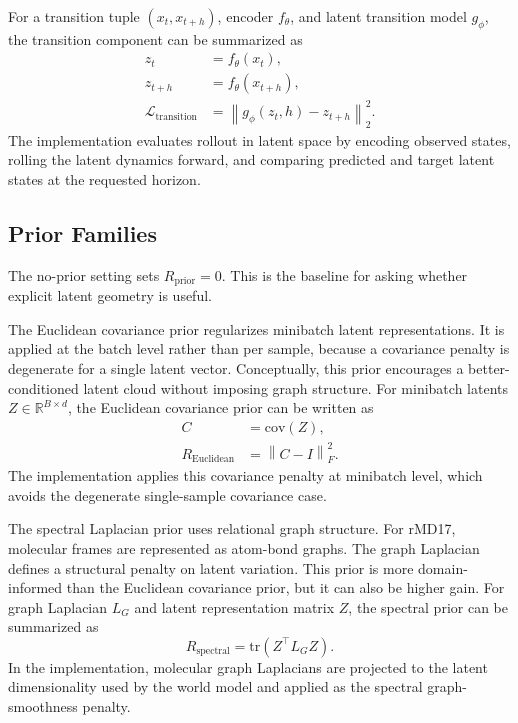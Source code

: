 \documentclass[pdflatex,sn-mathphys-num]{sn-jnl}
\begin{document}
For a transition tuple $(x_t, x_{t+h})$, encoder $f_\theta$, and latent transition model $g_\phi$, the transition component can be summarized as
\begin{align}
    z_t &= f_\theta(x_t),\\
    z_{t+h} &= f_\theta(x_{t+h}),\\
    \mathcal{L}_{\mathrm{transition}} &= \left\lVert g_\phi(z_t, h) - z_{t+h} \right\rVert_2^2.
\end{align}
The implementation evaluates rollout in latent space by encoding observed states, rolling the latent dynamics forward, and comparing predicted and target latent states at the requested horizon.

\subsection{Prior Families}

The no-prior setting sets $R_{\mathrm{prior}} = 0$. This is the baseline for asking whether explicit latent geometry is useful.

The Euclidean covariance prior regularizes minibatch latent representations. It is applied at the batch level rather than per sample, because a covariance penalty is degenerate for a single latent vector. Conceptually, this prior encourages a better-conditioned latent cloud without imposing graph structure. For minibatch latents $Z \in \mathbb{R}^{B \times d}$, the Euclidean covariance prior can be written as
\begin{align}
    C &= \mathrm{cov}(Z),\\
    R_{\mathrm{Euclidean}} &= \left\lVert C - I \right\rVert_F^2.
\end{align}
The implementation applies this covariance penalty at minibatch level, which avoids the degenerate single-sample covariance case.

The spectral Laplacian prior uses relational graph structure. For rMD17, molecular frames are represented as atom-bond graphs. The graph Laplacian defines a structural penalty on latent variation. This prior is more domain-informed than the Euclidean covariance prior, but it can also be higher gain. For graph Laplacian $L_G$ and latent representation matrix $Z$, the spectral prior can be summarized as
\begin{equation}
    R_{\mathrm{spectral}} = \mathrm{tr}(Z^\top L_G Z).
\end{equation}
In the implementation, molecular graph Laplacians are projected to the latent dimensionality used by the world model and applied as the spectral graph-smoothness penalty.
\end{document}

